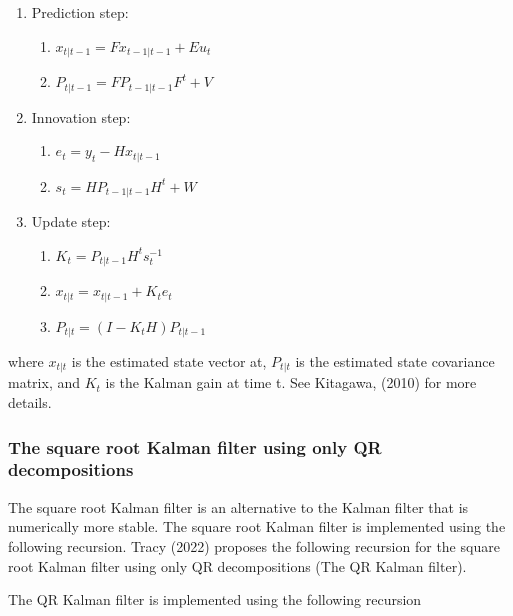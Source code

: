 \documentclass[
  letterpaper,
  DIV=11,
  numbers=noendperiod]{scrartcl}
\begin{document}
\begin{enumerate}
\def\labelenumi{\arabic{enumi}.}
\item
  Prediction step:

  \begin{enumerate}
  \def\labelenumii{\arabic{enumii}.}
  \item
    \(x_{t|t-1} = F x_{t-1|t-1} + E u_t\)
  \item
    \(P_{t|t-1} = F P_{t-1|t-1} F^t + V\)
  \end{enumerate}
\item
  Innovation step:

  \begin{enumerate}
  \def\labelenumii{\arabic{enumii}.}
  \item
    \(e_t = y_t - H x_{t|t-1}\)
  \item
    \(s_t = H P_{t-1|t-1}H^t + W\)
  \end{enumerate}
\item
  Update step:

  \begin{enumerate}
  \def\labelenumii{\arabic{enumii}.}
  \item
    \(K_t=P_{t|t-1} H^t s_t^{-1}\)
  \item
    \(x_{t|t} = x_{t|t-1} + K_t e_t\)
  \item
    \(P_{t|t} = (I - K_t H) P_{t|t-1}\)
  \end{enumerate}
\end{enumerate}

where \(x_{t|t}\) is the estimated state vector at, \(P_{t|t}\) is the
estimated state covariance matrix, and \(K_t\) is the Kalman gain at
time t. See Kitagawa, (2010) for more details.

\subsubsection{The square root Kalman filter using only QR
decompositions}\label{the-square-root-kalman-filter-using-only-qr-decompositions}

The square root Kalman filter is an alternative to the Kalman filter
that is numerically more stable. The square root Kalman filter is
implemented using the following recursion. Tracy (2022) proposes the
following recursion for the square root Kalman filter using only QR
decompositions (The QR Kalman filter).

The QR Kalman filter is implemented using the following recursion
\end{document}
